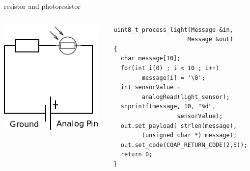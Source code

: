 \begin{frame}[containsverbatim]{resistor and photoresistor}
	\begin{columns}[c,onlytextwidth]
		\begin{column}[c]{.5\textwidth}
			\begin{center}
				\includegraphics [width=.9\textwidth,keepaspectratio]{img/resistor_photoresistor.png}
			\end{center}
		\end{column}
		\begin{column}[c]{.5\textwidth}
\begin{Verbatim}[fontsize=\scriptsize]
uint8_t process_light(Message &in, 
                     Message &out) 
{
  char message[10];
  for(int i(0) ; i < 10 ; i++)
        message[i] = '\0';
  int sensorValue = 
        analogRead(light_sensor);
  snprintf(message, 10, "%d", 
                  sensorValue);
  out.set_payload( strlen(message), 
        (unsigned char *) message);
  out.set_code(COAP_RETURN_CODE(2,5));
  return 0;
}
\end{Verbatim}
		\end{column}
	\end{columns}
\end{frame}

